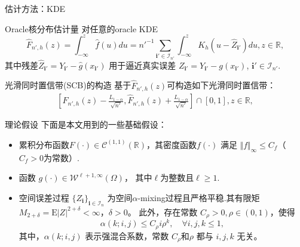 \documentclass{beamer}
\begin{document}
\begin{frame}{估计方法：KDE}
\begin{block}{Oracle核分布估计量}
对任意的oracle KDE
\begin{equation}\label{EQ:FN'hhat}
    \hat{F}_{n',h}(z) = \int_{-\infty}^{z}\hat{f}(u)du = n'^{-1}\sum_{\mathbf{i}'\in\mathcal{I}_{n'}}\int_{-\infty}^z K_h(u-\hat{Z}_{\mathbf{i}'})du,z\in\mathbb{R},
\end{equation}
其中残差$\hat{Z}_{\mathbf{i}'} = Y_{\mathbf{i}'} - \hat{g}(x_\mathbf{i'})$ 用于逼近真实误差 $Z_{\mathbf{i}'} = Y_{\mathbf{i}'} - g(x_\mathbf{i'})$, $\mathbf{i}'\in\mathcal{I}_{n'}$. 
\end{block}
\begin{block}{光滑同时置信带(SCB)的构造}
基于$\hat{F}_{n',h}(z)$可构造如下光滑同时置信带：
\begin{align} \label{SCB:FhatN'h}
    \left[\hat{F}_{n',h}(z)-\frac{L_{1-\alpha}}{\sqrt{n'}}, \hat{F}_{n',h}(z)+\frac{L_{1-\alpha}}{\sqrt{n'}}\right] \cap [0,1], z \in \mathbb{R},
\end{align}
\end{block}
\end{frame}

\begin{frame}{理论假设}
下面是本文用到的一些基础假设：

\begin{itemize}
\item[(A1)] 累积分布函数$F(\cdot) \in\mathcal{C}^{(1,1)}(\mathbb{R})$，其密度函数$f(\cdot)$ 满足 $\Vert f\Vert_{\infty}\leq C_f$（$C_f>0$为常数）.

\item[(A2)] 函数 $g(\cdot) \in \mathcal{W}^{\ell+1,\infty}(\Omega)$， 其中$\ell$为整数且$\ell\geq 1$.

\item[(A3)] 空间误差过程 $\{ Z_{\mathbf{i}} \}_{\mathbf{i} \in \mathcal{I}_n}$ 为空间$\alpha$-mixing过程且严格平稳.其有限矩$ M_{2+\delta} = \mathrm{E} |Z|^{2+\delta} < \infty $，$\delta > 0$。
此外，存在常数 $ C_\rho > 0,\rho \in (0,1) $，使得
\[
\alpha(k; i, j) \leq C_\rho i \rho^k, \quad \forall i, j, k \leq 1,
\]
其中，$\alpha(k; i, j)$ 表示强混合系数，常数 $C_\rho$和$\rho$ 都与 $i, j, k$ 无关。
\end{itemize}
\end{frame}
\end{document}
